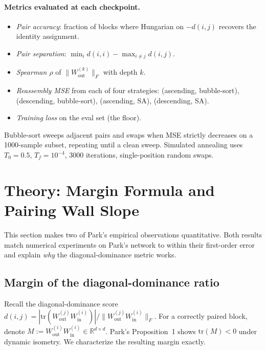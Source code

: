 \documentclass[10pt]{article}
\theoremstyle{remark}
\begin{document}
\paragraph{Metrics evaluated at each checkpoint.}
\begin{itemize}[leftmargin=*,itemsep=0pt]
  \item \emph{Pair accuracy}: fraction of blocks where Hungarian on
        $-d(i,j)$ recovers the identity assignment.
  \item \emph{Pair separation}: $\min_i d(i,i) - \max_{i\neq j} d(i,j)$.
  \item \emph{Spearman $\rho$} of $\|W_{\mathrm{out}}^{(k)}\|_F$ with depth $k$.
  \item \emph{Reassembly MSE} from each of four strategies:
        (ascending, bubble-sort), (descending, bubble-sort),
        (ascending, SA), (descending, SA).
  \item \emph{Training loss} on the eval set (the floor).
\end{itemize}

Bubble-sort sweeps adjacent pairs and swaps when MSE strictly decreases
on a 1000-sample subset, repeating until a clean sweep. Simulated
annealing uses $T_0=0.5$, $T_f=10^{-4}$, $3000$ iterations, single-position random swaps.

\section{Theory: Margin Formula and Pairing Wall Slope}\label{sec:theory}

This section makes two of Park's empirical observations quantitative.
Both results match numerical experiments on Park's network to within
their first-order error and explain \emph{why} the diagonal-dominance
metric works.

\subsection{Margin of the diagonal-dominance ratio}

Recall the diagonal-dominance score
$d(i,j) = |\mathrm{tr}(W_{\mathrm{out}}^{(j)} W_{\mathrm{in}}^{(i)})|/\|W_{\mathrm{out}}^{(j)} W_{\mathrm{in}}^{(i)}\|_F$.
For a correctly paired block, denote $M := W_{\mathrm{out}}^{(i)} W_{\mathrm{in}}^{(i)} \in \mathbb{R}^{d\times d}$.
Park's Proposition~1 shows $\mathrm{tr}(M)<0$ under dynamic isometry.
We characterize the resulting margin exactly.
\end{document}
